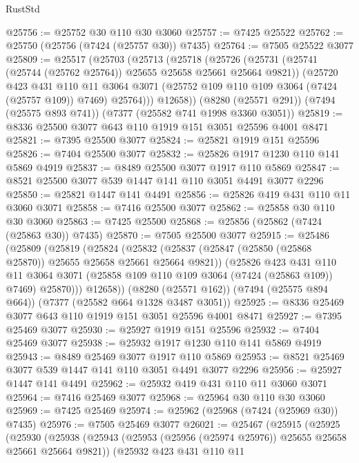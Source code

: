 \begin{lexlean}{RustStd}
\begin{coremodule}
@25756 := @25752 @30 @110 @30 @3060
@25757 := @7425 @25522
@25762 := @25750 (@25756 (@7424 (@25757 @30)) @7435)
@25764 := @7505 @25522 @3077
@25809 := @25517
    (@25703
      (@25713
        (@25718
          (@25726
            (@25731 (@25741 (@25744 (@25762 @25764)) @25655 @25658 @25661 @25664 @9821))
            (@25720
              @423
              @431
              @110
              @11
              @3064
              @3071
              (@25752 @109 @110 @109 @3064 (@7424 (@25757 @109)) @7469)
              @25764)))
        @12658))
    (@8280 (@25571 @291))
    (@7494 (@25575 @893 @741))
    (@7377 (@25582 @741 @1998 @3360 @3051))
@25819 := @8336 @25500 @3077 @643 @110 @1919 @151 @3051 @25596 @4001 @8471
@25821 := @7395 @25500 @3077
@25824 := @25821 @1919 @151 @25596
@25826 := @7404 @25500 @3077
@25832 := @25826 @1917 @1230 @110 @141 @5869 @4919
@25837 := @8489 @25500 @3077 @1917 @110 @5869
@25847 := @8521 @25500 @3077 @539 @1447 @141 @110 @3051 @4491 @3077 @2296
@25850 := @25821 @1447 @141 @4491
@25856 := @25826 @419 @431 @110 @11 @3060 @3071
@25858 := @7416 @25500 @3077
@25862 := @25858 @30 @110 @30 @3060
@25863 := @7425 @25500
@25868 := @25856 (@25862 (@7424 (@25863 @30)) @7435)
@25870 := @7505 @25500 @3077
@25915 := @25486
    (@25809
      (@25819
        (@25824
          (@25832
            (@25837 (@25847 (@25850 (@25868 @25870)) @25655 @25658 @25661 @25664 @9821))
            (@25826
              @423
              @431
              @110
              @11
              @3064
              @3071
              (@25858 @109 @110 @109 @3064 (@7424 (@25863 @109)) @7469)
              @25870)))
        @12658))
    (@8280 (@25571 @162))
    (@7494 (@25575 @894 @664))
    (@7377 (@25582 @664 @1328 @3487 @3051))
@25925 := @8336 @25469 @3077 @643 @110 @1919 @151 @3051 @25596 @4001 @8471
@25927 := @7395 @25469 @3077
@25930 := @25927 @1919 @151 @25596
@25932 := @7404 @25469 @3077
@25938 := @25932 @1917 @1230 @110 @141 @5869 @4919
@25943 := @8489 @25469 @3077 @1917 @110 @5869
@25953 := @8521 @25469 @3077 @539 @1447 @141 @110 @3051 @4491 @3077 @2296
@25956 := @25927 @1447 @141 @4491
@25962 := @25932 @419 @431 @110 @11 @3060 @3071
@25964 := @7416 @25469 @3077
@25968 := @25964 @30 @110 @30 @3060
@25969 := @7425 @25469
@25974 := @25962 (@25968 (@7424 (@25969 @30)) @7435)
@25976 := @7505 @25469 @3077
@26021 := @25467
    (@25915
      (@25925
        (@25930
          (@25938
            (@25943 (@25953 (@25956 (@25974 @25976)) @25655 @25658 @25661 @25664 @9821))
            (@25932
              @423
              @431
              @110
              @11

\end{coremodule}
\end{lexlean}
